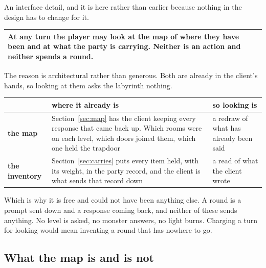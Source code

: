 \documentclass[11pt,a4paper]{article}
\begin{document}
An interface detail, and it is here rather than earlier because nothing in the design has to change
for it.

\begin{center}
\begin{tabular}{@{}>{\raggedright\arraybackslash}p{}@{}}
\toprule
\textbf{At any turn the player may look at the map of where they have been and at what the party is
carrying. Neither is an action and neither spends a round.} \\
\bottomrule
\end{tabular}
\end{center}

The reason is architectural rather than generous. Both are already in the client's hands, so
looking at them asks the labyrinth nothing.

\begin{center}
\begin{tabular}{@{}l@{\hspace{4mm}}>{\raggedright\arraybackslash}p{}@{\hspace{4mm}}>{\raggedright\arraybackslash}p{}@{}}
\toprule
& \textbf{where it already is} & \textbf{so looking is} \\
\midrule
\textbf{the map} & Section~\ref{sec:map} has the client keeping every response that came back up.
Which rooms were on each level, which doors joined them, which one held the trapdoor &
a redraw of what has already been said \\[1mm]
\textbf{the inventory} & Section~\ref{sec:carries} puts every item held, with its weight, in the
party record, and the client is what sends that record down &
a read of what the client wrote \\
\bottomrule
\end{tabular}
\end{center}

\begin{sectionbox}
Which is why it is free and could not have been anything else. A round is a prompt sent down and a
response coming back, and neither of these sends anything. No level is asked, no monster answers,
no light burns. Charging a turn for looking would mean inventing a round that has nowhere to go.
\end{sectionbox}

\subsection{What the map is and is not}
\end{document}
